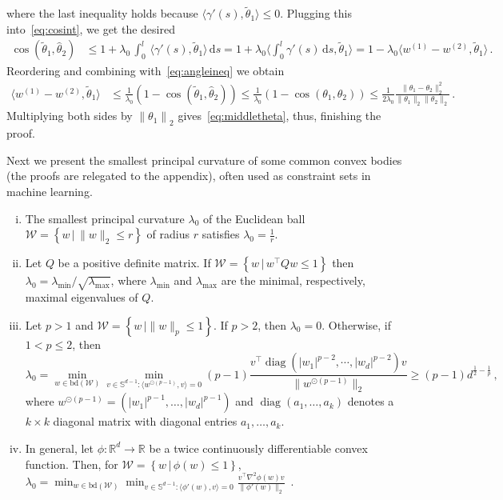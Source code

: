 \documentclass[english]{article}
\newcommand{\cW}{\mathcal{W}}
\newcommand{\seto}[1]{\left\{#1\right\}}
\newcommand{\R}{\mathbb{R}}
\newcommand{\bS}{\mathbb{S}}
\newcommand{\inpro}[2]{\langle #1, #2\rangle}
\newcommand{\set}[2]{\left\{#1 \,\vert\, #2 \right\}}
\newcommand{\ttheta}{\tilde{\theta}}
\newcommand{\htheta}{\hat{\theta}}
\newcommand{\norm}[1]{\left\| #1 \right\|}
\newcommand{\bd}{\mathrm{bd}}
\newcommand{\inangle}[2]{(#1,#2)}
\DeclareMathOperator{\diag}{diag}
\newenvironment{proofof}[1]{\par\noindent{\bf Proof of #1\ }}{\hfill\BlackBox\\[2mm]}
\begin{document}
\begin{proofof}{\cref{thm:R_curvesurface}}
\[\]
where the last inequality holds because $\inpro{\gamma'(s)}{\ttheta_1} \le 0$.
Plugging this into~\eqref{eq:cosint}, we get the desired
\begin{align*}
\cos \inangle{\ttheta_1}{\htheta_2}   
	& \le 1+ \lambda_0\, \int_{0}^{l} \, \inpro{\gamma'(s)}{\ttheta_1}  \,\text{d}s 
	    = 1+ \lambda_0 \Big\langle\int_{0}^{l} \gamma'(s) \,\text{d}s, \ttheta_1 \Big\rangle
	  = 1 - \lambda_0 \inpro{w^{(1)}  - w^{(2)}}{\ttheta_1}\,.
\end{align*}
Reordering and combining with~\eqref{eq:angleineq} we obtain
\begin{align*}
\inpro{w^{(1)}  - w^{(2)}}{\ttheta_1} 
	& \le \frac{1}{\lambda_0} \left( 1- \cos \inangle{\ttheta_1}{\htheta_2} \right)
	 \le \frac{1}{\lambda_0} \left( 1- \cos \inangle{\theta_1}{\theta_2} \right) 
	 \le \frac{1}{2\lambda_0} \frac{\|\theta_1 - \theta_2\|_2^2}{\|\theta_1\|_2\|\theta_2\|_2}\,.
\end{align*}
Multiplying both sides by $\norm{\theta_1}_2$ gives~\eqref{eq:middletheta}, thus, finishing the proof.
\end{proofof}

Next we present the smallest principal curvature of some common convex  bodies (the proofs are relegated to the appendix), often used as constraint sets in machine learning.

\begin{example}
	\label{ex:curvature}
\begin{enumerate}[(i)]\setlength{\itemsep}{0pt}
\item \label{it:ex1r} The smallest principal curvature $\lambda_0$ of the Euclidean ball $\cW = \set{w}{\|w\|_2\le r}$ of radius $r$ 
satisfies $\lambda_0=\frac{1}{r}$.

\item \label{it:ex1Q} Let $Q$ be a positive definite matrix.
If $\cW = \set{w}{w^\top Q w\le 1 }$ then $\lambda_0=\lambda_{\min}/\sqrt{\lambda_{\max}}$, 
where $\lambda_{\min}$ and $\lambda_{\max}$ are the minimal, respectively, maximal eigenvalues of $Q$.

\item \label{it:ex1Lp} Let $p>1$ and $\cW = \seto{w\,\vert \|w\|_p\le1 }$. If $p>2$, then $\lambda_0 = 0$. Otherwise, if $1<p\le 2$, then 
$$\lambda_0 = \min_{w\in \bd(\cW)} \min_{v \in \bS^{d-1}:  \inpro{w^{\odot(p-1)}}{v}=0} (p-1)\frac{v^{\top} \diag\left(|w_1|^{p-2},\cdots,|w_d|^{p-2}\right) v }{\|w^{\odot(p-1)}\|_2}  \ge (p-1)d^{\frac{1}{2} - \frac{1}{p}}\,,$$
where $w^{\odot(p-1)}=(|w_1|^{p-1},\ldots,|w_d|^{p-1})$ and $\diag(a_1,\ldots,a_k)$ denotes a $k\times k$ diagonal matrix with diagonal entries $a_1,\ldots,a_k$.

\item \label{it:ex1gen} In general, let $\phi:\R^d \to \R$ be a twice continuously differentiable convex function.
Then, for $\cW = \set{w}{\phi(w)\le 1}$, 
$\lambda_0=\min_{w\in\bd(\cW)}\min_{v \in \bS^{d-1}:  \inpro{\phi'(w)}{v}=0} \frac{v^{\top}\nabla^2\phi(w) v}{\|\phi'(w)\|_2}$~. 
\end{enumerate}
\end{example}
\end{document}
